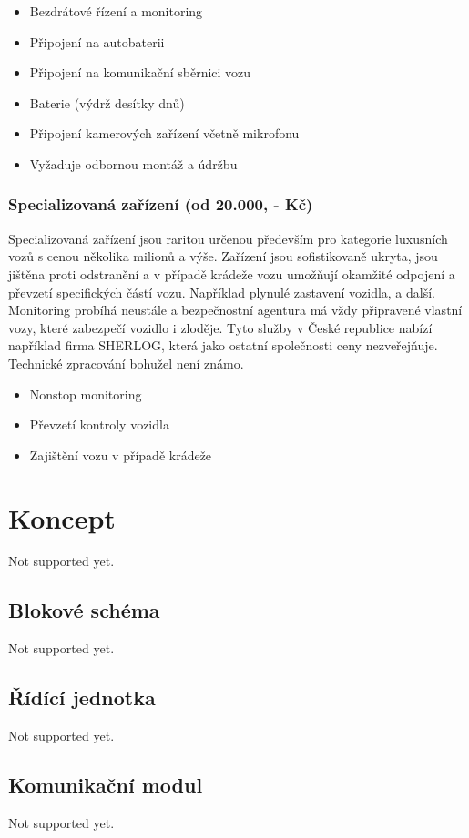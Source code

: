 \documentclass[FM,BP]{tulthesis}
\begin{document}
\begin{itemize}
\item Bezdrátové řízení a monitoring
\item Připojení na autobaterii
\item Připojení na komunikační sběrnici vozu
\item Baterie (výdrž desítky dnů)
\item Připojení kamerových zařízení včetně mikrofonu
\item Vyžaduje odbornou montáž a údržbu
\end{itemize}

\subsection{Specializovaná zařízení (od 20.000, - Kč)}
Specializovaná zařízení jsou raritou určenou především pro kategorie luxusních vozů s cenou několika milionů a výše. Zařízení jsou sofistikovaně ukryta, jsou jištěna proti odstranění a v případě krádeže vozu umožňují okamžité odpojení a převzetí specifických částí vozu. Například plynulé zastavení vozidla, a další. Monitoring probíhá neustále a bezpečnostní agentura má vždy připravené vlastní vozy, které zabezpečí vozidlo i zloděje. Tyto služby v České republice nabízí například firma SHERLOG, která jako ostatní společnosti ceny nezveřejňuje. Technické zpracování bohužel není známo.

\begin{itemize}
\item Nonstop monitoring
\item Převzetí kontroly vozidla
\item Zajištění vozu v případě krádeže
\end{itemize}

\chapter{Koncept}
Not supported yet.

\section{Blokové schéma}
Not supported yet.

\section{Řídící jednotka}
Not supported yet.

\section{Komunikační modul}
Not supported yet.
\end{document}
